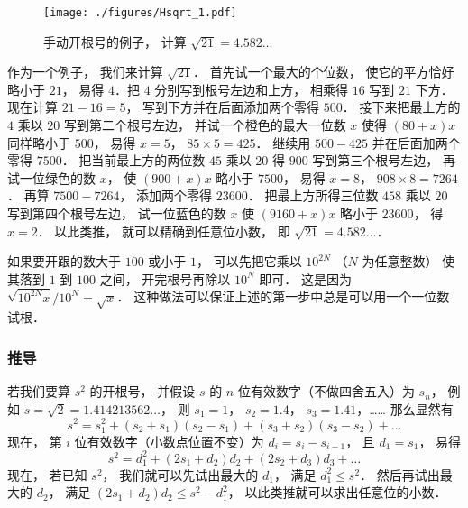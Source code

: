 
\begin{example}{}
\begin{figure}[ht]
\centering
\texttt{[image: ./figures/Hsqrt\_1.pdf]}
\caption{手动开根号的例子， 计算 $\sqrt{21} = 4.582\dots$} \label{Hsqrt_fig1}
\end{figure}
作为一个例子， 我们来计算 $\sqrt{21}$． 首先试一个最大的个位数， 使它的平方恰好略小于 $21$， 易得 $4$．把 $4$ 分别写到根号左边和上方， 相乘得 $16$ 写到 $21$ 下方． 现在计算 $21-16 = 5$， 写到下方并在后面添加两个零得 $500$． 接下来把最上方的 $4$ 乘以 $20$ 写到第二个根号左边， 并试一个橙色的最大一位数 $x$ 使得 $(80+x) x$ 同样略小于 $500$， 易得 $x = 5$， $85\times 5 = 425$． 继续用 $500-425$ 并在后面加两个零得 $7500$． 把当前最上方的两位数 $45$ 乘以 $20$ 得 $900$ 写到第三个根号左边， 再试一位绿色的数 $x$， 使 $(900+ x) x$ 略小于 $7500$， 易得 $x = 8$， $908\times 8 = 7264$． 再算 $7500-7264$， 添加两个零得 $23600$． 把最上方所得三位数 $458$ 乘以 $20$ 写到第四个根号左边， 试一位蓝色的数 $x$ 使 $(9160+x)x$ 略小于 $23600$， 得 $x = 2$． 以此类推， 就可以精确到任意位小数， 即 $\sqrt{21} = 4.582\dots$．

如果要开跟的数大于 $100$ 或小于 $1$， 可以先把它乘以 $10^{2N}$ （$N$ 为任意整数） 使其落到 $1$ 到 $100$ 之间， 开完根号再除以 $10^N$ 即可． 这是因为 $\sqrt{10^{2N} x}/10^N =  \sqrt{x}$． 这种做法可以保证上述的第一步中总是可以用一个一位数试根．
\end{example}

\subsubsection{推导}
若我们要算 $s^2$ 的开根号， 并假设 $s$ 的 $n$ 位有效数字（不做四舍五入）为 $s_n$， 例如 $s = \sqrt{2} = 1.414213562\dots$， 则 $s_1 = 1$， $s_2=1.4$， $s_3=1.41$，…… 那么显然有
\begin{equation}
s^2 = s_1^2 + (s_2+s_1)(s_2-s_1) + (s_3+s_2)(s_3-s_2) + \dots
\end{equation}
现在， 第 $i$ 位有效数字（小数点位置不变）为 $d_i = s_i-s_{i-1}$， 且 $d_1 = s_1$， 易得
\begin{equation}
s^2 = d_1^2 + (2s_1 + d_2)d_2 + (2s_2 + d_3)d_3 + \dots
\end{equation}
现在， 若已知 $s^2$， 我们就可以先试出最大的 $d_1$， 满足 $d_1^2\leqslant s^2$． 然后再试出最大的 $d_2$， 满足 $(2s_1 + d_2)d_2 \leqslant s^2 - d_1^2$， 以此类推就可以求出任意位的小数．
